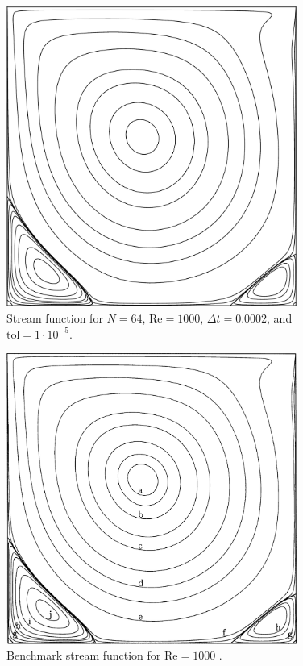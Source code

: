 \begin{figure}[p]
    \centering
    \includegraphics[width=0.85\textwidth]{Images/streamFunction.pdf}
    \caption{Stream function for $N = 64$, $\text{Re} = 1000$, $\Delta t = 0.0002$, and $\text{tol} = 1 \cdot 10^{-5}$.}
    \label{fig:SFN64}
\end{figure}

\begin{figure}[p]
    \centering
    \includegraphics[width=0.85\textwidth]{Images/streamFunction.png}
    \caption{Benchmark stream function for $\text{Re} = 1000$ \parencite{botella1998benchmark}.}
    \label{fig:benchmarkSFN64}
\end{figure}

